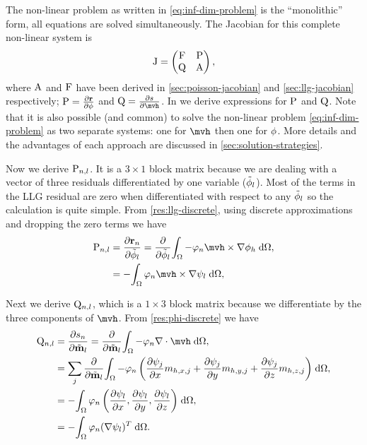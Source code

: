 The non-linear problem as written in \cref{eq:inf-dim-problem} is the ``monolithic'' form, \ie all equations are solved simultaneously.
The Jacobian for this complete non-linear system is
\begin{equation}
  \mathrm{J} =
  \begin{pmatrix}
    \mathrm{F}   & \mathrm{P} \\
    \mathrm{Q}   & \mathrm{A} \\
  \end{pmatrix},
  \label{eq:monolithic-jac}
\end{equation}
where $\mathrm{A}$ and $\mathrm{F}$ have been derived in \cref{sec:poisson-jacobian} and \cref{sec:llg-jacobian} respectively; $\mathrm{P} = \frac{\partial \boldsymbol{\mathrm{r}}}{\partial \phi}$ and $\Qm = \pd{\rphi}{\mvh}$.
In  we derive expressions for $\mathrm{P}$ and $\mathrm{Q}$.
Note that it is also possible (and common) to solve the non-linear problem \cref{eq:inf-dim-problem} as two separate systems: one for $\mvh$ then one for $\phi$.
More details and the advantages of each approach are discussed in \cref{sec:solution-strategies}.

Now we derive $\mathrm{P}_{n,l}$.
It is a $3 \times 1$ block matrix because we are dealing with a vector of three residuals differentiated by one variable ($\tilde{\phi}_l$).
Most of the terms in the LLG residual are zero when differentiated with respect to any $\tilde{\phi}_l$ so the calculation is quite simple.
From \cref{res:llg-discrete}, using discrete approximations and dropping the zero terms we have
\begin{equation}
  \begin{aligned}
    \Pm_{n,l} &= \pd{\rllgv_n}{\phimdis_l}
    = \pd{}{\phimdis_l} \intd{ -\tbf_n \mvh \times \grad \phimh}, \\
    &= -\intd{ \tbf_n \mvh \times \grad \sbf_l}, \\
  \end{aligned}
\end{equation}

Next we derive $\mathrm{Q}_{n,l}$, which is a $1 \times 3$ block matrix because we differentiate by the three components of $\mvh$.
From \cref{res:phi-discrete} we have
\begin{equation}
  \begin{aligned}
    \Qm_{n,l} &= \pd{\rphi_n}{\mvdis_l} = \pd{}{\mvdis_l} \intd{ -\tbf_n \div \mvh}, \\
    &= \sum_j \pd{}{\mvdis_l} \intd{ -\tbf_n \left( \pd{\sbf_j}{x} m_{h,x,j}
        + \pd{\sbf_j}{y} m_{h,y,j} + \pd{\sbf_j}{z} m_{h,z,j} \right) }, \\
    &= -\intd{ \tbf_n \left( \pd{\sbf_l}{x},
        \pd{\sbf_l}{y}, \pd{\sbf_l}{z} \right) }, \\
    &= -\intd{\tbf_n (\grad \sbf_l)^T}.
  \end{aligned}
\end{equation}


